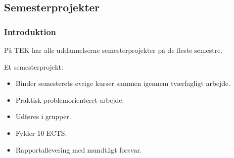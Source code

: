 {\begin{frame}[fragile]
{
  }
\end{frame}

\subsection{Semesterprojekter}
\begin{frame}[fragile]
  \frametitle{Introduktion }
  \vspace{5mm}
  På TEK har alle uddannelserne semesterprojekter på de fleste semestre.
  
  \pause
  \vspace{7mm}
  Et semesterprojekt:
  \begin{itemize}
    \item Binder semesterets øvrige kurser sammen igennem tværfagligt arbejde.
    \item Praktisk problemorienteret arbejde.
    \item Udføres i grupper.
    \item Fylder 10 ECTS.
    \item Rapportaflevering med mundtligt forsvar.
  \end{itemize}
\end{frame}

}


